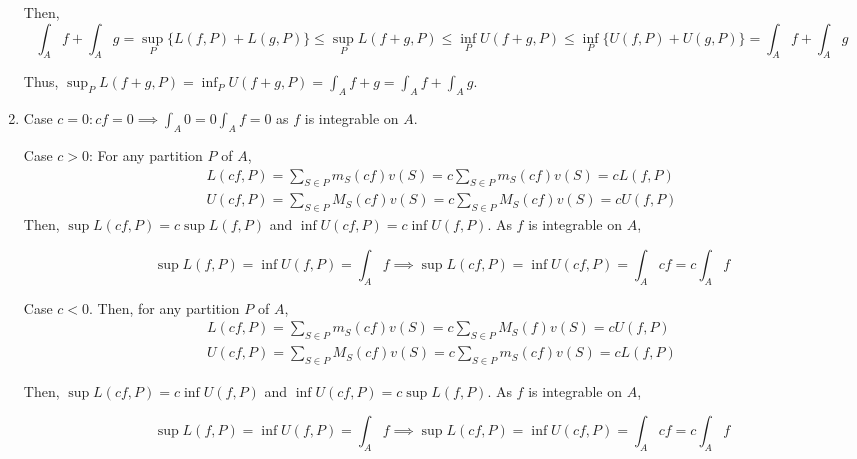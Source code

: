 \documentclass{exam}
\numberwithin{equation}{section}
\begin{document}
\begin{enumerate}[label=(\alph*)]
        Then, $$\int_Af+\int_Ag=\sup_P\{L(f,P)+L(g,P)\}\leq\sup_PL(f+g,P)\leq\inf_PU(f+g,P)\leq\inf_P\{U(f,P)+U(g,P)\}=\int_Af+\int_Ag$$

        Thus, $\sup_PL(f+g,P)=\inf_PU(f+g,P)=\int_Af+g=\int_Af+\int_Ag$.

        \item Case $c=0:cf=0\implies\int_A0=0\int_Af=0$ as $f$ is integrable on $A$.
        
        Case $c>0$: For any partition $P$ of $A$,
        \begin{align*}
            L(cf,P)=\sum_{S\in P} m_S(cf) v(S)=c\sum_{S\in P}m_S(cf)v(S)=cL(f,P)\\
            U(cf,P)=\sum_{S\in P} M_S(cf) v(S)=c\sum_{S\in P}M_S(cf)v(S)=cU(f,P)
        \end{align*}
        Then, $\sup L(cf,P)=c\sup L(f,P)$ and $\inf U(cf,P)=c\inf U(f,P)$. As $f$ is integrable on $A$, 
        
        $$\sup L(f,P)=\inf U(f,P)=\int_Af\implies\sup L(cf,P)=\inf U(cf,P)=\int_Acf=c\int_Af$$
        
        Case $c<0$. Then, for any partition $P$ of $A$,
        \begin{align*}
            L(cf,P)=\sum_{S\in P} m_S(cf) v(S)=c\sum_{S\in P}M_S(f)v(S)=cU(f,P)\\
            U(cf,P)=\sum_{S\in P} M_S(cf) v(S)=c\sum_{S\in P}m_S(cf)v(S)=cL(f,P)
        \end{align*}
        
        Then, $\sup L(cf,P)=c\inf U(f,P)$ and $\inf U(cf,P)=c\sup L(f,P)$. As $f$ is integrable on $A$, 
        
        $$\sup L(f,P)=\inf U(f,P)=\int_Af\implies\sup L(cf,P)=\inf U(cf,P)=\int_Acf=c\int_Af$$

    \end{enumerate}
\end{document}
